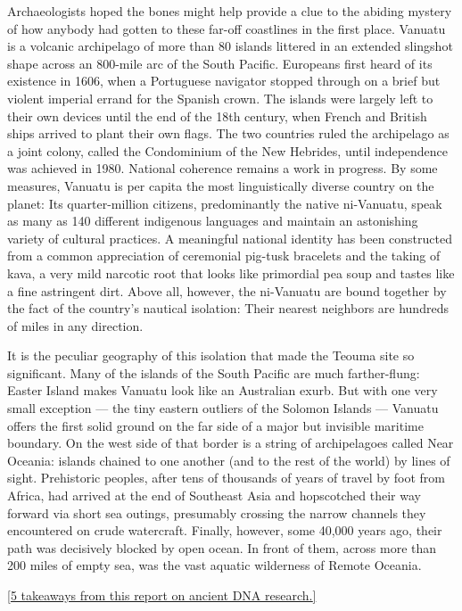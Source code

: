Archaeologists hoped the bones might help provide a clue to the abiding
mystery of how anybody had gotten to these far-off coastlines in the
first place. Vanuatu is a volcanic archipelago of more than 80 islands
littered in an extended slingshot shape across an 800-mile arc of the
South Pacific. Europeans first heard of its existence in 1606, when a
Portuguese navigator stopped through on a brief but violent imperial
errand for the Spanish crown. The islands were largely left to their own
devices until the end of the 18th century, when French and British ships
arrived to plant their own flags. The two countries ruled the
archipelago as a joint colony, called the Condominium of the New
Hebrides, until independence was achieved in 1980. National coherence
remains a work in progress. By some measures, Vanuatu is per capita the
most linguistically diverse country on the planet: Its quarter-million
citizens, predominantly the native ni-Vanuatu, speak as many as 140
different indigenous languages and maintain an astonishing variety of
cultural practices. A meaningful national identity has been constructed
from a common appreciation of ceremonial pig-tusk bracelets and the
taking of kava, a very mild narcotic root that looks like primordial pea
soup and tastes like a fine astringent dirt. Above all, however, the
ni-Vanuatu are bound together by the fact of the country's nautical
isolation: Their nearest neighbors are hundreds of miles in any
direction.

It is the peculiar geography of this isolation that made the Teouma site
so significant. Many of the islands of the South Pacific are much
farther-flung: Easter Island makes Vanuatu look like an Australian
exurb. But with one very small exception --- the tiny eastern outliers
of the Solomon Islands --- Vanuatu offers the first solid ground on the
far side of a major but invisible maritime boundary. On the west side of
that border is a string of archipelagoes called Near Oceania: islands
chained to one another (and to the rest of the world) by lines of sight.
Prehistoric peoples, after tens of thousands of years of travel by foot
from Africa, had arrived at the end of Southeast Asia and hopscotched
their way forward via short sea outings, presumably crossing the narrow
channels they encountered on crude watercraft. Finally, however, some
40,000 years ago, their path was decisively blocked by open ocean. In
front of them, across more than 200 miles of empty sea, was the vast
aquatic wilderness of Remote Oceania.

\href{https://www.nytimes3xbfgragh.onion/2019/01/17/magazine/ancient-dna-research.html}{{[}5
takeaways from this report on ancient DNA research.{]}}

